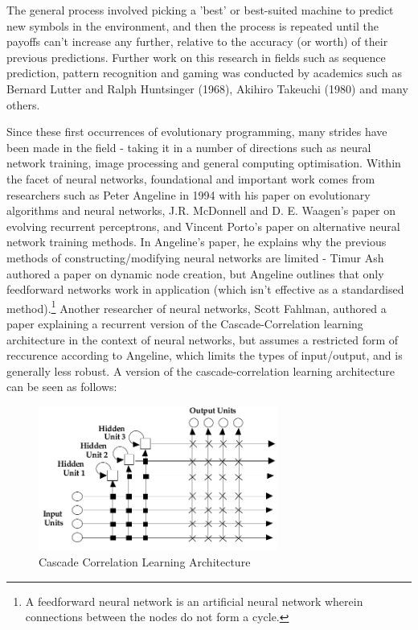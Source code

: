 \documentclass[12pt,a4paper]{article}
\begin{document}
\noindent
The general process involved picking a 'best' or best-suited machine to predict new symbols in the environment, and then the process is repeated until the payoffs can't increase any further, relative to the accuracy (or worth) of their previous predictions. Further work on this research in fields such as sequence prediction, pattern recognition and gaming was conducted by academics such as Bernard Lutter and Ralph Huntsinger (1968), Akihiro Takeuchi (1980) and many others.

\noindent
Since these first occurrences of evolutionary programming, many strides have been made in the field - taking it in a number of directions such as neural network training, image processing and general computing optimisation. Within the facet of neural networks, foundational and important work comes from researchers such as Peter Angeline in 1994 with his paper on evolutionary algorithms and neural networks, J.R. McDonnell and D. E. Waagen's paper on evolving recurrent perceptrons\cite{22}, and Vincent Porto's paper on alternative neural network training methods\cite{27}. In Angeline's paper\cite{1}, he explains why the previous methods of constructing/modifying neural networks are limited - Timur Ash authored a paper on dynamic node creation\cite{2}, but Angeline outlines that only feedforward networks work in application (which isn't effective as a standardised method).\footnote{A feedforward neural network is an artificial neural network wherein connections between the nodes do not form a cycle.} Another researcher of neural networks, Scott Fahlman, authored a paper explaining a recurrent version of the Cascade-Correlation learning architecture in the context of neural networks\cite{9}, but assumes a restricted form of reccurence according to Angeline, which limits the types of input/output, and is generally less robust. A version of the cascade-correlation learning architecture can be seen as follows: \\

\noindent
\begin{figure}[H]
	\centering
		\includegraphics[width=0.7\textwidth]{CascadeCorrelationLearningArchitecture}
		\caption{Cascade Correlation Learning Architecture\cite{50}}
\end{figure}
\end{document}
